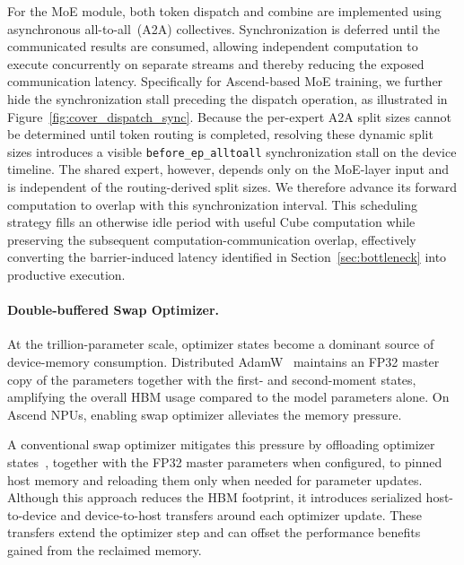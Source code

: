 For the MoE module, both token dispatch and combine are implemented using asynchronous all-to-all~(A2A) collectives. Synchronization is deferred until the communicated results are consumed, allowing independent computation to execute concurrently on separate streams and thereby reducing the exposed communication latency.
Specifically for Ascend-based MoE training, we further hide the synchronization stall preceding the dispatch operation, as illustrated in Figure~\ref{fig:cover_dispatch_sync}. Because the per-expert A2A split sizes cannot be determined until token routing is completed, resolving these dynamic split sizes introduces a visible \texttt{before\_ep\_alltoall} synchronization stall on the device timeline. The shared expert, however, depends only on the MoE-layer input and is independent of the routing-derived split sizes. We therefore advance its forward computation to overlap with this synchronization interval. This scheduling strategy fills an otherwise idle period with useful Cube computation while preserving the subsequent computation-communication overlap, effectively converting the barrier-induced latency identified in Section~\ref{sec:bottleneck} into productive execution.

\paragraph{Double-buffered Swap Optimizer.}
\label{subsec:swap_optimizer}
At the trillion-parameter scale, optimizer states become a dominant source of device-memory consumption. Distributed AdamW~\citep{loshchilov2017decoupled} maintains an FP32 master copy of the parameters together with the first- and second-moment states, amplifying the overall HBM usage compared to the model parameters alone. 
On Ascend NPUs, enabling swap optimizer alleviates the memory pressure.

A conventional swap optimizer mitigates this pressure by offloading optimizer states~\citep{ren2021zero}, together with the FP32 master parameters when configured, to pinned host memory and reloading them only when needed for parameter updates. Although this approach reduces the HBM footprint, it introduces serialized host-to-device and device-to-host transfers around each optimizer update. These transfers extend the optimizer step and can offset the performance benefits gained from the reclaimed memory.


